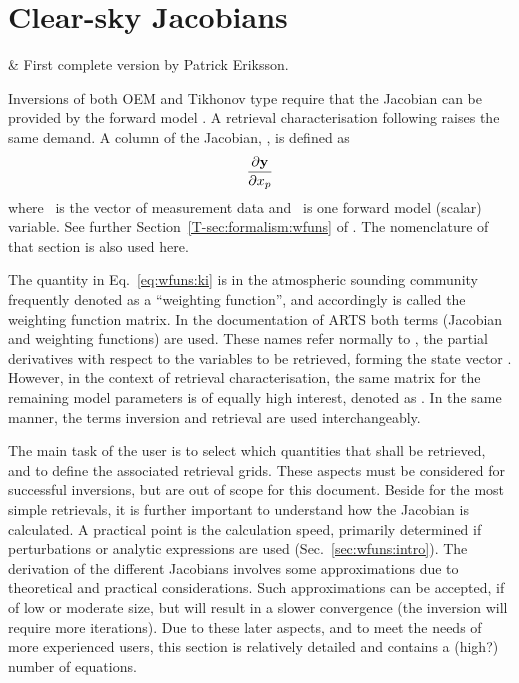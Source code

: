 \chapter{Clear-sky Jacobians}
 \label{sec:wfuns}

  & First complete version by Patrick Eriksson.\\
 \stophistory

\graphicspath{{Figs/wfuns/}}


Inversions of both OEM and Tikhonov type require that the Jacobian can be
provided by the forward model \citep[see e.g.][]{eriksson:analy:00}. A
retrieval characterisation following \citet{rodgers:90,rodgers:00} raises the
same demand. A column of the Jacobian, \aWfnMtr{\SttVct}, is defined as
\begin{equation}
  \frac{\partial\mathbf{y}}{\partial x_{p}}
  \label{eq:wfuns:ki}
\end{equation}
where \MsrVct\ is the vector of measurement data and \ is one forward
model (scalar) variable. See further Section~\ref{T-sec:formalism:wfuns} of
\theory. The nomenclature of that section is also used here.

The quantity in Eq.~\ref{eq:wfuns:ki} is in the atmospheric sounding
community frequently denoted as a ``weighting function'', and accordingly
\aWfnMtr{\SttVct} is called the weighting function matrix. In the documentation
of ARTS both terms (Jacobian and weighting functions) are used. These names
refer normally to \aWfnMtr{\SttVct}, the partial derivatives with respect to
the variables to be retrieved, forming the state vector \SttVct. However, in
the context of retrieval characterisation, the same matrix for the remaining
model parameters is of equally high interest, denoted as \aWfnMtr{\FrwMdlVct}.
In the same manner, the terms inversion and retrieval are used interchangeably.

The main task of the user is to select which quantities that shall be
retrieved, and to define the associated retrieval grids. These aspects must be
considered for successful inversions, but are out of scope for this document.
Beside for the most simple retrievals, it is further important to understand
how the Jacobian is calculated. A practical point is the calculation speed,
primarily determined if perturbations or analytic expressions are used
(Sec.~\ref{sec:wfuns:intro}). The derivation of the different Jacobians
involves some approximations due to theoretical and practical considerations.
Such approximations can be accepted, if of low or moderate size, but will
result in a slower convergence (the inversion will require more iterations).
Due to these later aspects, and to meet the needs of more experienced users,
this section is relatively detailed and contains a (high?) number of equations.

